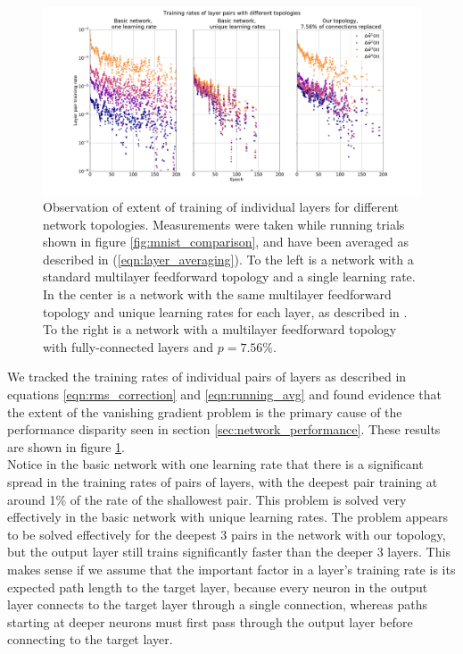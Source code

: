 \documentclass[format=sigconf]{acmart}
\newcommand{\npar}{\\\indent}
\begin{document}
\begin{figure}
  \centering
  \includegraphics[width=\columnwidth]{figures/MNIST_individual_layers.pdf}
  \caption{Observation of extent of training of individual layers for different network topologies. Measurements were taken while running trials shown in figure \ref{fig:mnist_comparison}, and have been averaged as described in (\ref{eqn:layer_averaging}). To the left is a network with a standard multilayer feedforward topology and a single learning rate. In the center is a network with the same multilayer feedforward topology and unique learning rates for each layer, as described in \cite{scellier17}. To the right is a network with a multilayer feedforward topology with fully-connected layers and $p=7.56\%$.}
  \label{fig:mnist_layers}
\end{figure}

We tracked the training rates of individual pairs of layers as described in equations \ref{eqn:rms_correction} and \ref{eqn:running_avg} and found evidence that the extent of the vanishing gradient problem is the primary cause of the performance disparity seen in section \ref{sec:network_performance}. These results are shown in figure \ref{fig:mnist_layers}.
\npar
Notice in the basic network with one learning rate that there is a significant spread in the training rates of pairs of layers, with the deepest pair training at around 1\% of the rate of the shallowest pair. This problem is solved very effectively in the basic network with unique learning rates. The problem appears to be solved effectively for the deepest 3 pairs in the network with our topology, but the output layer still trains significantly faster than the deeper 3 layers. This makes sense if we assume that the important factor in a layer's training rate is its expected path length to the target layer, because every neuron in the output layer connects to the target layer through a single connection, whereas paths starting at deeper neurons must first pass through the output layer before connecting to the target layer.
\end{document}
